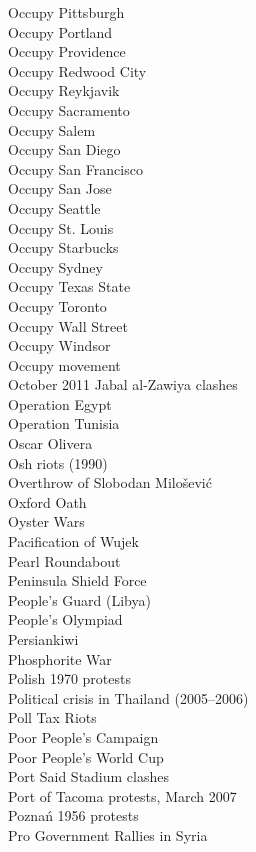 Occupy Pittsburgh\\
Occupy Portland\\
Occupy Providence\\
Occupy Redwood City\\
Occupy Reykjavik\\
Occupy Sacramento\\
Occupy Salem\\
Occupy San Diego\\
Occupy San Francisco\\
Occupy San Jose\\
Occupy Seattle\\
Occupy St. Louis\\
Occupy Starbucks\\
Occupy Sydney\\
Occupy Texas State\\
Occupy Toronto\\
Occupy Wall Street\\
Occupy Windsor\\
Occupy movement\\
October 2011 Jabal al-Zawiya clashes\\
Operation Egypt\\
Operation Tunisia\\
Oscar Olivera\\
Osh riots (1990)\\
Overthrow of Slobodan Milošević\\
Oxford Oath\\
Oyster Wars\\
Pacification of Wujek\\
Pearl Roundabout\\
Peninsula Shield Force\\
People's Guard (Libya)\\
People's Olympiad\\
Persiankiwi\\
Phosphorite War\\
Polish 1970 protests\\
Political crisis in Thailand (2005–2006)\\
Poll Tax Riots\\
Poor People's Campaign\\
Poor People's World Cup\\
Port Said Stadium clashes\\
Port of Tacoma protests, March 2007\\
Poznań 1956 protests\\
Pro Government Rallies in Syria\\
